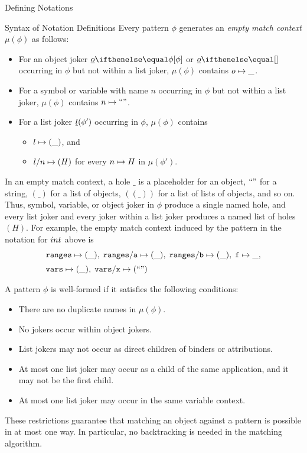 \begin{omgroup}[creators=miko,short={Notation and Presentation},id=pres]
\begin{omgroup}[creators={miko,frabe},id=sec:ntn-definition]{Defining Notations}
\begin{omgroup}[id=sec:nd:syntax]{Syntax of Notation Definitions}
Every pattern $\phi$ generates an \emph{empty match context} $\mu(\phi)$ as follows:
\begin{itemize}
\item For an object joker $\JObj[\phi]{o}$ or $\JObj{o}$ occurring in $\phi$ but not within a list joker,
  $\mu(\phi)$ contains $o\mapsto \_$.
\item For a symbol or variable with name $n$ occurring in $\phi$ but not within a list
  joker, $\mu(\phi)$ contains $n\mapsto \mbox{``''}$.
\item For a list joker $\underline{l}(\phi')$ occurring in $\phi$, $\mu(\phi)$ contains
  \begin{itemize}
  \item $l\mapsto (\_)$, and
  \item $l/n\mapsto (H)$ for every $n\mapsto H$ in $\mu(\phi')$.
  \end{itemize}
\end{itemize}
In an empty match context, a hole $\_$ is a placeholder for an object, $\mbox{``''}$ for a
string, $(\_)$ for a list of objects, $((\_))$ for a list of lists of objects, and so
on. Thus, symbol, variable, or object joker in $\phi$ produce a single named hole, and
every list joker and every joker within a list joker produces a named list of holes
$(H)$. For example, the empty match context induced by the pattern in the notation for
$\mathop{int}$ above is
 \[\begin{array}{l}\mathtt{ranges}\mapsto (\_),\;\mathtt{ranges}/\mathtt{a}\mapsto (\_),\;\mathtt{ranges}/\mathtt{b}\mapsto (\_),\;\mathtt{f}\mapsto \_,\\[.2cm]
  \mathtt{vars}\mapsto (\_),\;\mathtt{vars}/\mathtt{x}\mapsto (\mbox{``''})\end{array}\]

A pattern $\phi$ is well-formed if it satisfies the following conditions:
\begin{itemize}
  \item There are no duplicate names in $\mu(\phi)$.
  \item No jokers occur within object jokers.
  \item List jokers may not occur as direct children of binders or attributions.
  \item At most one list joker may occur as a child of the same application, and it may not be the first child.
  \item At most one list joker may occur in the same variable context.
\end{itemize}
These restrictions guarantee that matching an {\openmath} object against a pattern is possible in at most one way. In particular, no backtracking is needed in the matching algorithm.


\end{omgroup}
\end{omgroup}
\end{omgroup}
